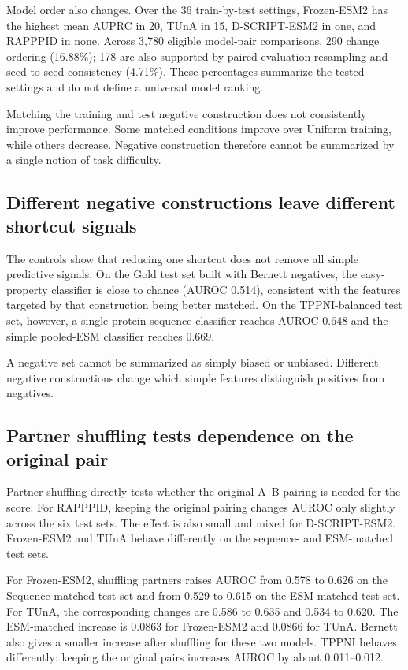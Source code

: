 \documentclass{article}
\begin{document}
Model order also changes. Over the 36 train-by-test settings, Frozen-ESM2 has
the highest mean AUPRC in 20, TUnA in 15, D-SCRIPT-ESM2 in one, and RAPPPID in
none. Across 3,780 eligible model-pair comparisons, 290 change ordering
(16.88\%); 178 are also supported by paired evaluation resampling and
seed-to-seed consistency (4.71\%). These percentages summarize the tested
settings and do not define a universal model ranking.

Matching the training and test negative construction does not consistently
improve performance. Some matched conditions improve over Uniform training,
while others decrease. Negative construction therefore cannot be summarized by
a single notion of task difficulty.

\subsection{Different negative constructions leave different shortcut signals}

The controls show that reducing one shortcut does not remove all simple
predictive signals. On the Gold test set built with Bernett negatives, the
easy-property classifier is close to chance (AUROC 0.514), consistent with the
features targeted by that construction being better matched. On the
TPPNI-balanced test set, however, a single-protein sequence classifier reaches
AUROC 0.648 and the simple pooled-ESM classifier reaches 0.669.

A negative set cannot be summarized as simply biased or unbiased. Different
negative constructions change which simple features distinguish positives from
negatives.

\subsection{Partner shuffling tests dependence on the original pair}

Partner shuffling directly tests whether the original A--B pairing is needed
for the score. For RAPPPID, keeping the original pairing changes AUROC only
slightly across the six test sets. The effect is also small and mixed for
D-SCRIPT-ESM2. Frozen-ESM2 and TUnA behave differently on the sequence- and
ESM-matched test sets.

For Frozen-ESM2, shuffling partners raises AUROC from 0.578 to 0.626 on the
Sequence-matched test set and from 0.529 to 0.615 on the ESM-matched test set.
For TUnA, the corresponding changes are 0.586 to 0.635 and 0.534 to 0.620.
The ESM-matched increase is 0.0863 for Frozen-ESM2 and 0.0866 for TUnA.
Bernett also gives a smaller increase after shuffling for these two models.
TPPNI behaves differently: keeping the original pairs increases AUROC by about
0.011--0.012.
\end{document}

